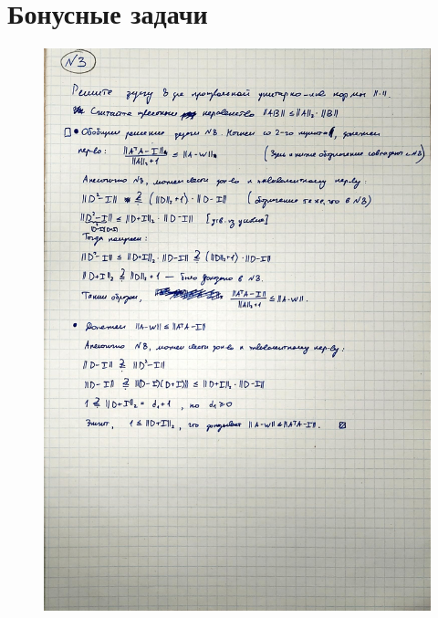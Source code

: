\documentclass{article}
\begin{document}
		\section*{Бонусные задачи}
		\begin{figure}[h!]
			\includegraphics[width=0.95\linewidth]{handwritten/matcomp_hw1_bonus_3}
		\end{figure}
\end{document}
